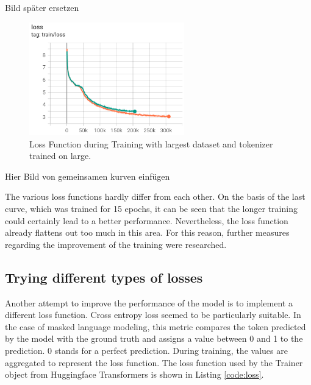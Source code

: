 \alert{Bild später ersetzen}
\begin{figure}[H]
	\centering
	\includegraphics[width=0.6\textwidth]{figures/loss_infs2_large.png}
	\caption{Loss Function during Training with largest dataset and tokenizer trained on large.}
	\label{fig:loss_large_large}
\end{figure}

\alert{Hier Bild von gemeinsamen kurven einfügen}

The various loss functions hardly differ from each other. On the basis of the last curve, which was trained for 15 epochs, it can be seen that the longer training could certainly lead to a better performance. Nevertheless, the loss function already flattens out too much in this area. For this reason, further \alert{ measures} regarding the improvement of the training were researched.

\subsection{Trying different types of losses}
Another attempt to improve the performance of the model is to implement a different loss function. Cross entropy loss seemed to be particularly suitable. In the case of masked language modeling, this metric compares the token predicted by the model with the ground truth and assigns a value between 0 and 1 to the prediction. 0 stands for a perfect prediction. During training, the values are aggregated to represent the loss function. \newline
The loss function used by the \alert{Trainer object from Huggingface Transformers} is shown in Listing \ref{code:loss}.

